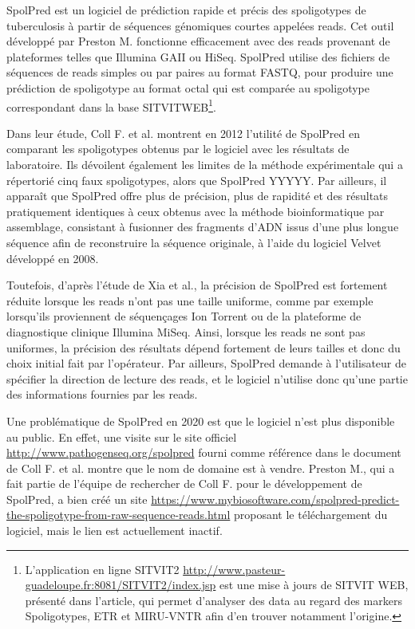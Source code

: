 \documentclass[twoside,a4paper,11pt,frenchb,openany]{report}
\begin{document}
SpolPred est un logiciel de prédiction rapide et précis des spoligotypes de tuberculosis à partir de séquences génomiques courtes appelées reads. Cet outil développé par Preston M. fonctionne efficacement avec des reads provenant de plateformes telles que Illumina GAII ou HiSeq. SpolPred utilise des fichiers de séquences de reads simples ou par paires au format FASTQ, pour produire une prédiction de spoligotype au format octal qui est comparée au spoligotype correspondant dans la base SITVITWEB\footnote{L'application en ligne SITVIT2 \url{http://www.pasteur-guadeloupe.fr:8081/SITVIT2/index.jsp} est une mise à jours de SITVIT WEB, présenté dans l'article\cite{demay}, qui permet d'analyser des data au regard des markers Spoligotypes, ETR et MIRU-VNTR afin d'en trouver notamment l'origine.}.

Dans leur étude, Coll F. et al.\cite{coll} montrent en 2012 l'utilité de SpolPred en comparant les spoligotypes obtenus par le logiciel avec les résultats de laboratoire. Ils dévoilent également les limites de la méthode expérimentale qui a répertorié cinq faux spoligotypes, alors que SpolPred YYYYY. Par ailleurs, il apparaît que SpolPred offre plus de précision, plus de rapidité et des résultats pratiquement identiques à ceux obtenus avec la méthode bioinformatique par assemblage, consistant à fusionner des fragments d'ADN issus d'une plus longue séquence afin de reconstruire la séquence originale, à l'aide du logiciel Velvet développé en 2008.

Toutefois, d'après l'étude de Xia et al.\cite{xia}, la précision de SpolPred est fortement réduite lorsque les reads n'ont pas une taille uniforme, comme par exemple lorsqu'ils proviennent de séquençages Ion Torrent ou de la plateforme de diagnostique clinique Illumina MiSeq. Ainsi, lorsque les reads ne sont pas uniformes, la précision des résultats dépend fortement de leurs tailles et donc du choix initial fait par l'opérateur. Par ailleurs, SpolPred demande à l'utilisateur de spécifier la direction de lecture des reads, et le logiciel n'utilise donc qu'une partie des informations fournies par les reads.

Une problématique de SpolPred en 2020 est que le logiciel n'est plus disponible au public. En effet, une visite sur le site officiel \url{http://www.pathogenseq.org/spolpred} fourni comme référence dans le document \cite{coll} de Coll F. et al. montre que le nom de domaine est à vendre. Preston M., qui a fait partie de l'équipe de rechercher de Coll F. pour le développement de SpolPred, a bien créé un site \url{https://www.mybiosoftware.com/spolpred-predict-the-spoligotype-from-raw-sequence-reads.html} proposant le téléchargement du logiciel, mais le lien est actuellement inactif.
\end{document}
